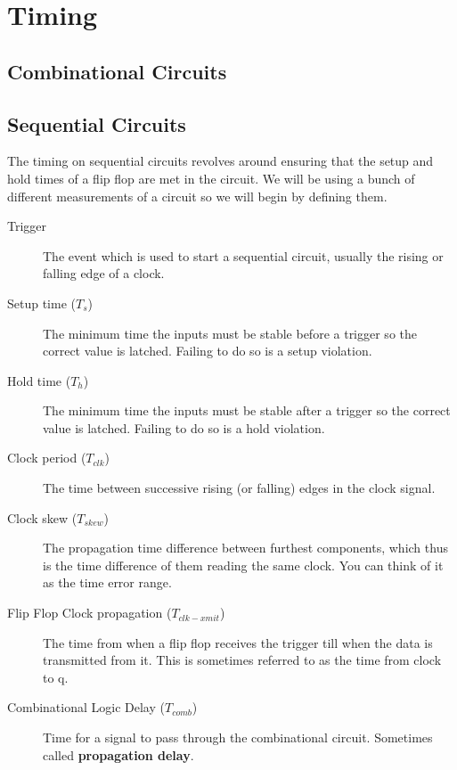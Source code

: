 \chapter{Timing}

\section{Combinational Circuits}





\section{Sequential Circuits}

The timing on sequential circuits revolves around ensuring that the setup and hold times of a flip flop are met in the circuit.  We will be using a bunch of different measurements of a circuit so we will begin by defining them.
\begin{description}
  \item[Trigger] The event which is used to start a sequential circuit, usually the rising or falling edge of a clock.
  \item[Setup time ($T_s$)] The minimum time the inputs must be stable before a trigger so the correct value is latched.  Failing to do so is a setup violation.
  \item[Hold time ($T_h$)] The minimum time the inputs must be stable after a trigger so the correct value is latched.  Failing to do so is a hold violation.
  \item[Clock period ($T_{clk}$)] The time between successive rising (or falling) edges in the clock signal.
  \item[Clock skew ($T_{skew}$)] The propagation time difference between furthest components, which thus is the time difference of them reading the same clock.  You can think of it as the time error range.
  \item[Flip Flop Clock propagation ($T_{clk-xmit}$)]  The time from when a flip flop receives the trigger till when the data is transmitted from it.  This is sometimes referred to as the time from clock to q.
  \item[Combinational Logic Delay ($T_{comb}$)] Time for a signal to pass through the combinational circuit.  Sometimes called \textbf{propagation delay}.
\end{description}

